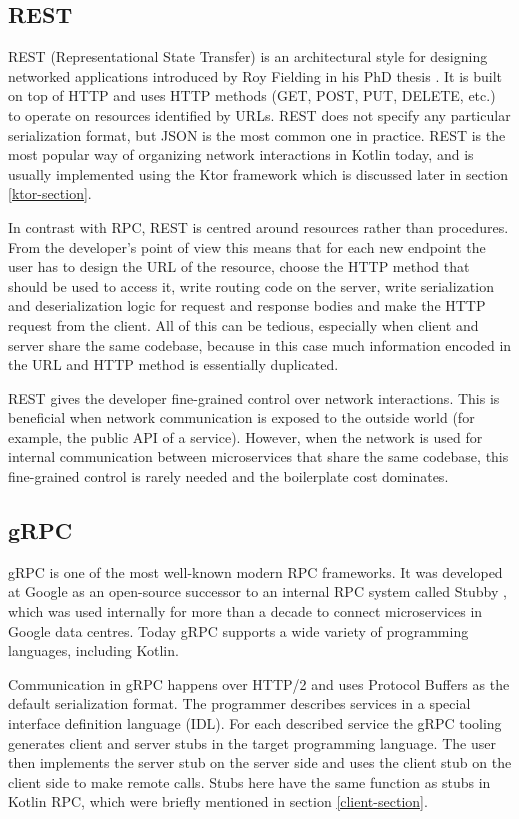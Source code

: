 \documentclass[a4paper,11pt,oneside]{article}
\begin{document}
\subsection{REST}

REST (Representational State Transfer) is an architectural style for designing networked
applications introduced by Roy Fielding in his PhD thesis \cite{fielding_architectural_2000}. It
is built on top of HTTP and uses HTTP methods (GET, POST, PUT, DELETE, etc.) to operate on
resources identified by URLs. REST does not specify any particular serialization format, but JSON
is the most common one in practice. REST is the most popular way of organizing network
interactions in Kotlin today, and is usually implemented using the Ktor framework
\cite{noauthor_ktor_nodate} which is discussed later in section \ref{ktor-section}.

In contrast with RPC, REST is centred around resources rather than procedures. From the
developer's point of view this means that for each new endpoint the user has to design the URL of the
resource, choose the HTTP method that should be used to access it, write routing code on the server,
write serialization and deserialization logic for request and response bodies and make the HTTP
request from the client. All of this can be tedious, especially when client and server share
the same codebase, because in this case much information encoded in the URL and HTTP method
is essentially duplicated.

REST gives the developer fine-grained control over network interactions. This is beneficial
when network communication is exposed to the outside world (for example, the public API of a service).
However, when the network is used for internal communication between microservices that share the
same codebase, this fine-grained control is rarely needed and the boilerplate cost dominates.

\subsection{gRPC}

gRPC \cite{noauthor_grpc_nodate} is one of the most well-known modern RPC frameworks. It was
developed at Google as an open-source successor to an internal RPC system called Stubby
\cite{ryan_grpc_2015}, which was used internally for more than a decade to connect microservices in
Google data centres. Today gRPC supports a wide variety of programming languages, including Kotlin.

Communication in gRPC happens over HTTP/2 and uses Protocol Buffers
\cite{noauthor_protocol_buffers_nodate} as the default serialization format. The programmer describes
services in a special interface definition language (IDL). For each described service the gRPC tooling
generates client and server stubs in the target programming language. The user then implements the server stub
on the server side and uses the client stub on the client side to make remote calls. Stubs here have
the same function as stubs in Kotlin RPC, which were briefly mentioned in section
\ref{client-section}.
\end{document}
